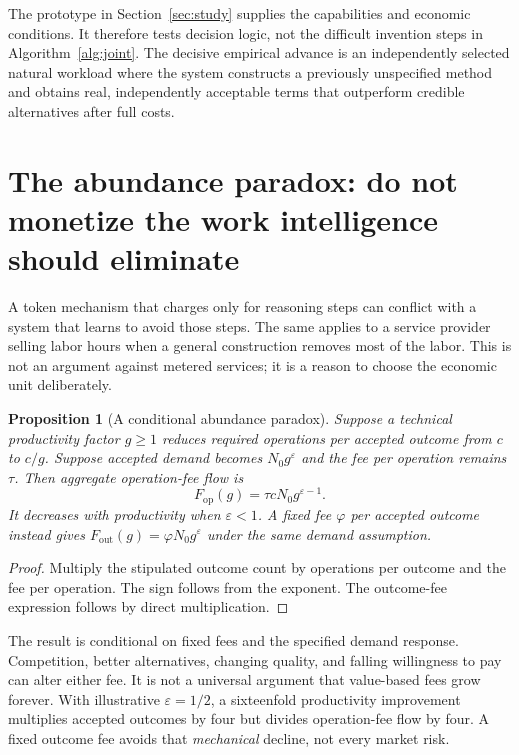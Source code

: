 \documentclass[11pt,letterpaper]{article}
\newtheorem{proposition}{Proposition}[section]
\theoremstyle{remark}\newtheorem{remark}{Remark}[section]
\begin{document}
The prototype in Section~\ref{sec:study} supplies the capabilities and economic conditions. It therefore tests decision logic, not the difficult invention steps in Algorithm~\ref{alg:joint}. The decisive empirical advance is an independently selected natural workload where the system constructs a previously unspecified method and obtains real, independently acceptable terms that outperform credible alternatives after full costs.

\section{The abundance paradox: do not monetize the work intelligence should eliminate}
\label{sec:abundance}
A token mechanism that charges only for reasoning steps can conflict with a system that learns to avoid those steps. The same applies to a service provider selling labor hours when a general construction removes most of the labor. This is not an argument against metered services; it is a reason to choose the economic unit deliberately.

\begin{proposition}[A conditional abundance paradox]\label{prop:abundance}
Suppose a technical productivity factor $g\ge1$ reduces required operations per accepted outcome from $c$ to $c/g$. Suppose accepted demand becomes $N_0g^{\varepsilon}$ and the fee per operation remains $\tau$. Then aggregate operation-fee flow is
\begin{equation}\label{eq:abundance}
F_{\mathrm{op}}(g)=\tau cN_0g^{\varepsilon-1}.
\end{equation}
It decreases with productivity when $\varepsilon<1$. A fixed fee $\varphi$ per accepted outcome instead gives $F_{\mathrm{out}}(g)=\varphi N_0g^{\varepsilon}$ under the same demand assumption.
\end{proposition}
\begin{proof}
Multiply the stipulated outcome count by operations per outcome and the fee per operation. The sign follows from the exponent. The outcome-fee expression follows by direct multiplication.
\end{proof}

The result is conditional on fixed fees and the specified demand response. Competition, better alternatives, changing quality, and falling willingness to pay can alter either fee. It is not a universal argument that value-based fees grow forever. With illustrative $\varepsilon=1/2$, a sixteenfold productivity improvement multiplies accepted outcomes by four but divides operation-fee flow by four. A fixed outcome fee avoids that \emph{mechanical} decline, not every market risk.
\end{document}
